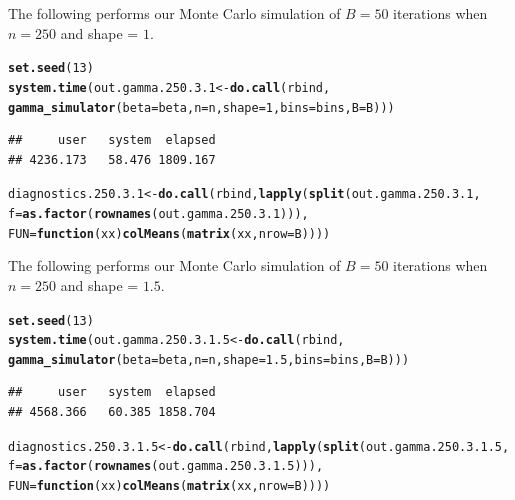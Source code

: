 \documentclass[11pt]{article}\usepackage[]{graphicx}\usepackage[]{color}
\makeatletter
\newcommand{\hlnum}[1]{\textcolor[rgb]{0.686,0.059,0.569}{#1}}%
\newcommand{\hlstd}[1]{\textcolor[rgb]{0.345,0.345,0.345}{#1}}%
\newcommand{\hlkwa}[1]{\textcolor[rgb]{0.161,0.373,0.58}{\textbf{#1}}}%
\newcommand{\hlkwb}[1]{\textcolor[rgb]{0.69,0.353,0.396}{#1}}%
\newcommand{\hlkwc}[1]{\textcolor[rgb]{0.333,0.667,0.333}{#1}}%
\newcommand{\hlkwd}[1]{\textcolor[rgb]{0.737,0.353,0.396}{\textbf{#1}}}%
\newenvironment{kframe}{%
 \def\at@end@of@kframe{}%
 \ifinner\ifhmode%
  \def\at@end@of@kframe{\end{minipage}}%
  \begin{minipage}{\columnwidth}%
 \fi\fi%
 \def\FrameCommand##1{\hskip\@totalleftmargin \hskip-\fboxsep
 \colorbox{shadecolor}{##1}\hskip-\fboxsep
     \hskip-\linewidth \hskip-\@totalleftmargin \hskip\columnwidth}%
 \MakeFramed {\advance\hsize-\width
   \@totalleftmargin\z@ \linewidth\hsize
   \@setminipage}}%
 {\par\unskip\endMakeFramed%
 \at@end@of@kframe}
\newenvironment{knitrout}{}{} %
\makeatother
\begin{document}
The following performs our Monte Carlo simulation of $B = 50$ iterations 
when $n = 250$ and shape = $1$.

\begin{knitrout}
\color{fgcolor}\begin{kframe}
\begin{alltt}
\hlkwd{set.seed}\hlstd{(}\hlnum{13}\hlstd{)}
\hlkwd{system.time}\hlstd{(out.gamma.250.3.1} \hlkwb{<-} \hlkwd{do.call}\hlstd{(rbind,}
  \hlkwd{gamma_simulator}\hlstd{(}\hlkwc{beta} \hlstd{= beta,} \hlkwc{n} \hlstd{= n,} \hlkwc{shape} \hlstd{=} \hlnum{1}\hlstd{,} \hlkwc{bins} \hlstd{= bins,} \hlkwc{B} \hlstd{= B)))}
\end{alltt}
\begin{verbatim}
##     user   system  elapsed 
## 4236.173   58.476 1809.167
\end{verbatim}
\begin{alltt}
\hlstd{diagnostics.250.3.1} \hlkwb{<-} \hlkwd{do.call}\hlstd{(rbind,} \hlkwd{lapply}\hlstd{(}\hlkwd{split}\hlstd{(out.gamma.250.3.1,}
  \hlkwc{f} \hlstd{=} \hlkwd{as.factor}\hlstd{(}\hlkwd{rownames}\hlstd{(out.gamma.250.3.1))),}
  \hlkwc{FUN} \hlstd{=} \hlkwa{function}\hlstd{(}\hlkwc{xx}\hlstd{)} \hlkwd{colMeans}\hlstd{(}\hlkwd{matrix}\hlstd{(xx,} \hlkwc{nrow} \hlstd{= B))))}
\end{alltt}
\end{kframe}
\end{knitrout}




The following performs our Monte Carlo simulation of $B = 50$ iterations 
when $n = 250$ and shape = $1.5$.

\begin{knitrout}
\color{fgcolor}\begin{kframe}
\begin{alltt}
\hlkwd{set.seed}\hlstd{(}\hlnum{13}\hlstd{)}
\hlkwd{system.time}\hlstd{(out.gamma.250.3.1.5} \hlkwb{<-} \hlkwd{do.call}\hlstd{(rbind,}
  \hlkwd{gamma_simulator}\hlstd{(}\hlkwc{beta} \hlstd{= beta,} \hlkwc{n} \hlstd{= n,} \hlkwc{shape} \hlstd{=} \hlnum{1.5}\hlstd{,} \hlkwc{bins} \hlstd{= bins,} \hlkwc{B} \hlstd{= B)))}
\end{alltt}
\begin{verbatim}
##     user   system  elapsed 
## 4568.366   60.385 1858.704
\end{verbatim}
\begin{alltt}
\hlstd{diagnostics.250.3.1.5} \hlkwb{<-} \hlkwd{do.call}\hlstd{(rbind,} \hlkwd{lapply}\hlstd{(}\hlkwd{split}\hlstd{(out.gamma.250.3.1.5,}
  \hlkwc{f} \hlstd{=} \hlkwd{as.factor}\hlstd{(}\hlkwd{rownames}\hlstd{(out.gamma.250.3.1.5))),}
  \hlkwc{FUN} \hlstd{=} \hlkwa{function}\hlstd{(}\hlkwc{xx}\hlstd{)} \hlkwd{colMeans}\hlstd{(}\hlkwd{matrix}\hlstd{(xx,} \hlkwc{nrow} \hlstd{= B))))}
\end{alltt}
\end{kframe}
\end{knitrout}
\end{document}
